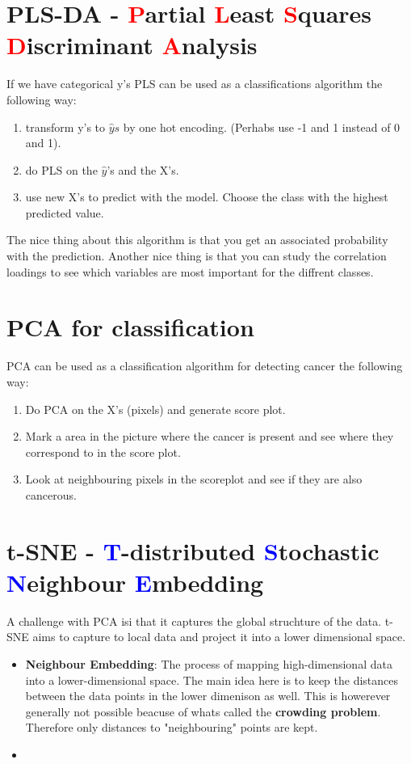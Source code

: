 \section{PLS-DA - \textcolor{red}{P}artial \textcolor{red}{L}east \textcolor{red}{S}quares \textcolor{red}{D}iscriminant \textcolor{red}{A}nalysis}
If we have categorical y's PLS can be used as a classifications algorithm the following way:
\begin{enumerate}
    \item transform y's to $\hat{y}s$ by one hot encoding. (Perhabs use -1 and 1 instead of 0 and 1).
    \item do PLS on the $\hat{y}$'s and the X's.
    \item use new X's to predict with the model. Choose the class with the highest predicted value.
\end{enumerate}
The nice thing about this algorithm is that you get an associated probability with the prediction. \newline
Another nice thing is that you can study the correlation loadings to see which variables are most important for the diffrent classes. \newline

\section{PCA for classification}
PCA can be used as a classification algorithm for detecting cancer the following way:
\begin{enumerate}
    \item Do PCA on the X's (pixels) and generate score plot.
    \item Mark a area in the picture where the cancer is present and see where they correspond to in the score plot.
    \item Look at neighbouring pixels in the scoreplot and see if they are also cancerous.
\end{enumerate}

\section{t-SNE - \textcolor{blue}{T}-distributed \textcolor{blue}{S}tochastic \textcolor{blue}{N}eighbour \textcolor{blue}{E}mbedding}
A challenge with PCA isi that it captures the global struchture of the data. t-SNE aims to capture to local data and project it into a lower dimensional space.
\begin{itemize}
    \item \textbf{Neighbour Embedding}: The process of mapping high-dimensional data into a lower-dimensional space. The main idea here is to keep the distances between the data points in the lower dimenison as well. This is howerever generally not possible beacuse of whats called the \textbf{crowding problem}. Therefore only distances to "neighbouring" points are kept.
    \item 
\end{itemize}

